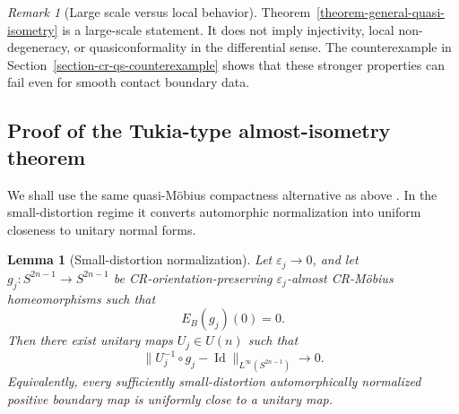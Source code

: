 \documentclass[11pt]{article}
\newtheorem{lemma}[theorem]{Lemma}
\theoremstyle{definition}
\theoremstyle{remark}
\newtheorem{remark}[theorem]{Remark}
\theoremstyle{definition}
\newcommand{\Id}{\operatorname{Id}}
\begin{document}
\begin{remark}[Large scale versus local behavior]
\label{remark-qi-versus-local-collapse}
Theorem~\ref{theorem-general-quasi-isometry} is a large-scale statement.  It
does not imply injectivity, local non-degeneracy, or quasiconformality in the
differential sense.  The counterexample in
Section~\ref{section-cr-qs-counterexample} shows that these stronger properties
can fail even for smooth contact boundary data.
\end{remark}


\subsection{Proof of the Tukia-type almost-isometry theorem}

We shall use the same quasi-M\"obius compactness alternative as above
\cite[Corollary~2.7]{Haissinsky}.  In the small-distortion regime it converts
automorphic normalization into uniform closeness to unitary normal forms.

\begin{lemma}[Small-distortion normalization]
\label{lemma-small-distortion-normalization}
Let \(\varepsilon_j\to0\), and let
\(g_j:S^{2n-1}\to S^{2n-1}\) be CR-orientation-preserving
\(\varepsilon_j\)-almost CR-M\"obius homeomorphisms such that
\[
        E_B(g_j)(0)=0.
\]
Then there exist unitary maps \(U_j\in U(n)\) such that
\[
        \|U_j^{-1}\circ g_j-\Id\|_{L^\infty(S^{2n-1})}\to0.
\]
Equivalently, every sufficiently small-distortion automorphically normalized
positive boundary map is uniformly close to a unitary map.
\end{lemma}
\end{document}

